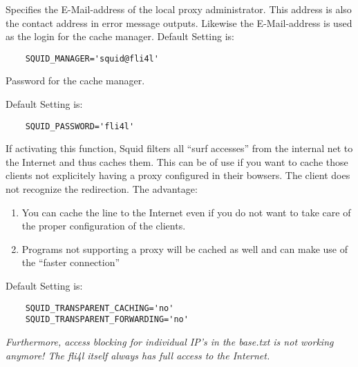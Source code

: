 \begin{description}

                Specifies the \mbox{E-Mail}-address of the local proxy administrator.
		This address is also the contact address in error message outputs.
		Likewise the {E-Mail}-address is used as the login for the cache manager.
                Default Setting is:
\begin{verbatim}
	SQUID_MANAGER='squid@fli4l'
\end{verbatim}



                Password for the cache manager.

                Default Setting is:
\begin{verbatim}
	SQUID_PASSWORD='fli4l'
\end{verbatim}



    If activating this function, Squid filters all ``surf accesses'' from the
    internal net to the Internet and thus caches them. This can be of use if you
    want to cache those clients not explicitely having a proxy configured in their
    bowsers. The client does not recognize the redirection. The advantage:
\begin{enumerate}
    \item{You can cache the line to the Internet
	  even if you do not want to take care of the proper
	  configuration of the clients.}
    \item{Programs not supporting a proxy will be cached as well
	  and can make use of the ``faster connection''}
\end{enumerate}
    Default Setting is:
\begin{verbatim}
	SQUID_TRANSPARENT_CACHING='no'
	SQUID_TRANSPARENT_FORWARDING='no'
\end{verbatim}


                \emph{Furthermore, access blocking
                                 for individual IP's in the base.txt is not
                                 working anymore! The fli4l itself always has
                                 full access to the Internet.}
        

\end{description}
